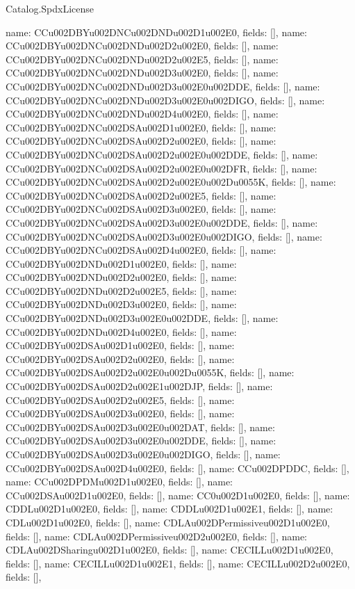 \begin{lexlean}{Catalog.SpdxLicense}
\begin{semanticmodule}
{    {name: CCu002DBYu002DNCu002DNDu002D1u002E0, fields: []},
    {name: CCu002DBYu002DNCu002DNDu002D2u002E0, fields: []},
    {name: CCu002DBYu002DNCu002DNDu002D2u002E5, fields: []},
    {name: CCu002DBYu002DNCu002DNDu002D3u002E0, fields: []},
    {name: CCu002DBYu002DNCu002DNDu002D3u002E0u002DDE, fields: []},
    {name: CCu002DBYu002DNCu002DNDu002D3u002E0u002DIGO, fields: []},
    {name: CCu002DBYu002DNCu002DNDu002D4u002E0, fields: []},
    {name: CCu002DBYu002DNCu002DSAu002D1u002E0, fields: []},
    {name: CCu002DBYu002DNCu002DSAu002D2u002E0, fields: []},
    {name: CCu002DBYu002DNCu002DSAu002D2u002E0u002DDE, fields: []},
    {name: CCu002DBYu002DNCu002DSAu002D2u002E0u002DFR, fields: []},
    {name: CCu002DBYu002DNCu002DSAu002D2u002E0u002Du0055K, fields: []},
    {name: CCu002DBYu002DNCu002DSAu002D2u002E5, fields: []},
    {name: CCu002DBYu002DNCu002DSAu002D3u002E0, fields: []},
    {name: CCu002DBYu002DNCu002DSAu002D3u002E0u002DDE, fields: []},
    {name: CCu002DBYu002DNCu002DSAu002D3u002E0u002DIGO, fields: []},
    {name: CCu002DBYu002DNCu002DSAu002D4u002E0, fields: []},
    {name: CCu002DBYu002DNDu002D1u002E0, fields: []},
    {name: CCu002DBYu002DNDu002D2u002E0, fields: []},
    {name: CCu002DBYu002DNDu002D2u002E5, fields: []},
    {name: CCu002DBYu002DNDu002D3u002E0, fields: []},
    {name: CCu002DBYu002DNDu002D3u002E0u002DDE, fields: []},
    {name: CCu002DBYu002DNDu002D4u002E0, fields: []},
    {name: CCu002DBYu002DSAu002D1u002E0, fields: []},
    {name: CCu002DBYu002DSAu002D2u002E0, fields: []},
    {name: CCu002DBYu002DSAu002D2u002E0u002Du0055K, fields: []},
    {name: CCu002DBYu002DSAu002D2u002E1u002DJP, fields: []},
    {name: CCu002DBYu002DSAu002D2u002E5, fields: []},
    {name: CCu002DBYu002DSAu002D3u002E0, fields: []},
    {name: CCu002DBYu002DSAu002D3u002E0u002DAT, fields: []},
    {name: CCu002DBYu002DSAu002D3u002E0u002DDE, fields: []},
    {name: CCu002DBYu002DSAu002D3u002E0u002DIGO, fields: []},
    {name: CCu002DBYu002DSAu002D4u002E0, fields: []},
    {name: CCu002DPDDC, fields: []},
    {name: CCu002DPDMu002D1u002E0, fields: []},
    {name: CCu002DSAu002D1u002E0, fields: []},
    {name: CC0u002D1u002E0, fields: []},
    {name: CDDLu002D1u002E0, fields: []},
    {name: CDDLu002D1u002E1, fields: []},
    {name: CDLu002D1u002E0, fields: []},
    {name: CDLAu002DPermissiveu002D1u002E0, fields: []},
    {name: CDLAu002DPermissiveu002D2u002E0, fields: []},
    {name: CDLAu002DSharingu002D1u002E0, fields: []},
    {name: CECILLu002D1u002E0, fields: []},
    {name: CECILLu002D1u002E1, fields: []},
    {name: CECILLu002D2u002E0, fields: []},
}
\end{semanticmodule}
\end{lexlean}
